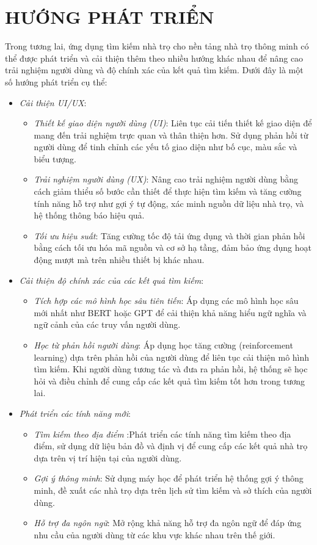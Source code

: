 \section{HƯỚNG PHÁT TRIỂN}
\hspace*{1cm}  Trong tương lai, ứng dụng tìm kiếm nhà trọ cho nền tảng nhà trọ thông minh có thể được phát triển và cải thiện thêm theo nhiều hướng khác nhau để nâng cao trải nghiệm người dùng và độ chính xác của kết quả tìm kiếm. Dưới đây là một số hướng phát triển cụ thể:
\begin{itemize}
    \item \textit{Cải thiện UI/UX}:
    \begin{itemize}
        \item \textit{Thiết kế giao diện người dùng (UI)}: Liên tục cải tiến thiết kế giao diện để mang đến trải nghiệm trực quan và thân thiện hơn. Sử dụng phản hồi từ người dùng để tinh chỉnh các yếu tố giao diện như bố cục, màu sắc và biểu tượng.
        \item \textit{Trải nghiệm người dùng (UX)}: Nâng cao trải nghiệm người dùng bằng cách giảm thiểu số bước cần thiết để thực hiện tìm kiếm và tăng cường tính năng hỗ trợ như gợi ý tự động, xác minh nguồn dữ liệu nhà trọ, và hệ thống thông báo hiệu quả.
        \item \textit{Tối ưu hiệu suất}: Tăng cường tốc độ tải ứng dụng và thời gian phản hồi bằng cách tối ưu hóa mã nguồn và cơ sở hạ tầng, đảm bảo ứng dụng hoạt động mượt mà trên nhiều thiết bị khác nhau.
    \end{itemize}

    \item \textit{Cải thiện độ chính xác của các kết quả tìm kiếm}:
    \begin{itemize}
        \item \textit{Tích hợp các mô hình học sâu tiên tiến}: Áp dụng các mô hình học sâu mới nhất như BERT hoặc GPT để cải thiện khả năng hiểu ngữ nghĩa và ngữ cảnh của các truy vấn người dùng.
        \item \textit{Học từ phản hồi người dùng}: Áp dụng học tăng cường (reinforcement learning) dựa trên phản hồi của người dùng để liên tục cải thiện mô hình tìm kiếm. Khi người dùng tương tác và đưa ra phản hồi, hệ thống sẽ học hỏi và điều chỉnh để cung cấp các kết quả tìm kiếm tốt hơn trong tương lai.
    \end{itemize}

    \item \textit{Phát triển các tính năng mới}:
    \begin{itemize}
        \item \textit{Tìm kiếm theo địa điểm} :Phát triển các tính năng tìm kiếm theo địa điểm, sử dụng dữ liệu bản đồ và định vị để cung cấp các kết quả nhà trọ dựa trên vị trí hiện tại của người dùng.
        \item \textit{Gợi ý thông minh}: Sử dụng máy học để phát triển hệ thống gợi ý thông minh, đề xuất các nhà trọ dựa trên lịch sử tìm kiếm và sở thích của người dùng.
        \item \textit{Hỗ trợ đa ngôn ngữ}: Mở rộng khả năng hỗ trợ đa ngôn ngữ để đáp ứng nhu cầu của người dùng từ các khu vực khác nhau trên thế giới.
    \end{itemize}


\end{itemize}
